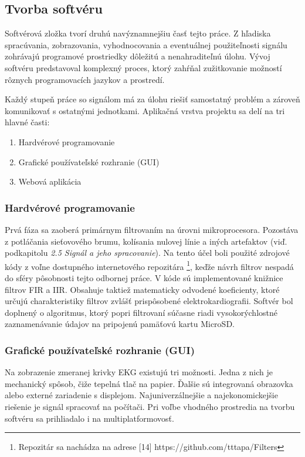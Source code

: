 \documentclass[titlepage,12pt]{article}
\begin{document}
\newpage
\subsection{Tvorba softvéru}
Softvérová zložka tvorí druhú navýznamnejšiu časť tejto práce. Z hľadiska spracúvania, zobrazovania, vyhodnocovania a eventuálnej použiteľnosti signálu zohrávajú programové prostriedky dôležitú a nenahraditeľnú úlohu. Vývoj softvéru predstavoval komplexný proces, ktorý zahŕňal zužitkovanie možností rôznych programovacích jazykov a prostredí.

Každý stupeň práce so signálom má za úlohu riešiť samostatný problém a zároveň komunikovať s ostatnými jednotkami. Aplikačná vrstva projektu sa delí na tri hlavné časti:
\begin{enumerate}
	\item Hardvérové programovanie
	\item Grafické používateľské rozhranie (GUI)
	\item Webová aplikácia
\end{enumerate}

\subsubsection{Hardvérové programovanie}
Prvá fáza sa zaoberá primárnym filtrovaním na úrovni mikroprocesora. Pozostáva z potláčania sieťovového brumu, kolísania nulovej línie a iných artefaktov (viď. podkapitolu \textit{2.5 Signál \linebreak a jeho spracovanie}). Na tento účel boli použité zdrojové kódy z voľne dostupného internetového repozitára \footnote{Repozitár sa nachádza na adrese [14] https://github.com/tttapa/Filters}, keďže návrh filtrov nespadá do sféry pôsobnosti tejto odbornej práce. V kóde sú implementované knižnice filtrov FIR a IIR. Obsahuje taktiež matematicky odvodené koeficienty, ktoré určujú charakteristiky filtrov zvlášť prispôsobené elektrokardiografii. Softvér bol doplnený o algoritmus, ktorý popri filtrovaní súčasne riadi vysokorýchlostné zaznamenávanie údajov na pripojenú pamäťovú kartu MicroSD.

\subsubsection{Grafické používateľské rozhranie (GUI)}
Na zobrazenie zmeranej krivky EKG existujú tri možnosti. Jedna z nich je mechanický spôsob, čiže tepelná tlač na papier. Ďalšie sú integrovaná obrazovka alebo externé zariadenie s displejom. Najuniverzálnejšie a najekonomickejšie riešenie je signál spracovať na počítači. Pri voľbe vhodného prostredia na tvorbu softvéru sa prihliadalo i na multiplatformovosť.
\end{document}
